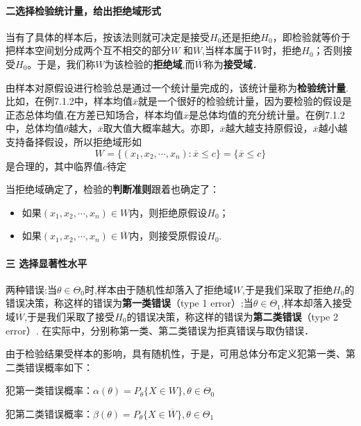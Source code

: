 \paragraph{二\quad 选择检验统计量，给出拒绝域形式}
当有了具体的样本后，按该法则就可决定是接受$H_0$还是拒绝$H_0$，即检验就等价于把样本空间划分成两个互不相交的部分$W$
和$\overline{W}$,当样本属于$W$时，拒绝$H_0$；否则接受$H_0$。于是，我们称$W$为该检验的\textbf{拒绝域},而$\overline{W}$称为\textbf{接受域}．

由样本对原假设进行检验总是通过一个统计量完成的，该统计量称为\textbf{检验统计量}.比如，在例7.1.2中，样本均值$\overline{x}$就是一个很好的检验统计量，因为要检验的假设是正态总体均值,在方差已知场合，样本均值$\overline{x}$是总体均值的充分统计量。在例7.1.2中，总体均值$\theta$越大，$\overline{x}$取大值大概率越大。亦即，$\overline{x}$越大越支持原假设，$\overline{x}$越小越支持备择假设，所以拒绝域形如
$$
    W=\{(x_{1},x_{2},\cdots,x_{n}):\overline{x}\leq c\}=\{\overline{x}\leq c\}
$$
是合理的，其中临界值$c$待定

当拒绝域确定了，检验的\textbf{判断准则}跟着也确定了：
\begin{itemize}
    \item 如果$(x_1,x_2,\cdots,x_n) \in W$内，则拒绝原假设$H_0$；
    \item 如果$(x_1,x_2,\cdots,x_n) \in \overline{W}$内，则接受原假设$H_0$.
\end{itemize}

\paragraph{三 \quad 选择显著性水平} 两种错误:当$\theta\in\Theta_0$时,样本由于随机性却落入了拒绝域$W$,于是我们采取了拒绝$H_0$的错误决策，称这样的错误为\textbf{第一类错误}（type 1 error）;当$\theta \in \Theta_1$,样本却落入接受域$\overline{W}$,于是我们采取了接受$H_0$的错误决策，称这样的错误为\textbf{第二类错误}（type 2 error）.
在实际中，分别称第一类、第二类错误为拒真错误与取伪错误．

由于检验结果受样本的影响，具有随机性，于是，可用总体分布定义犯第一类、第二类错误概率如下：

犯第一类错误概率：$\alpha(\theta)=P_{\theta}\{X \in W\},\theta \in \Theta_0$

犯第二类错误概率：$\beta(\theta)=P_{\theta}\{X \in \overline{W}\},\theta \in \Theta_1$

